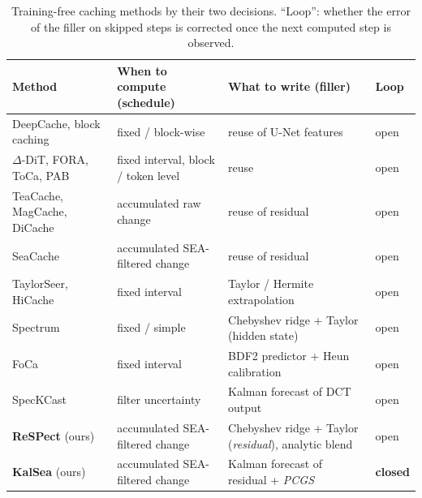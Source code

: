 \begin{table}[t]
  \centering
  \small
  \caption[Summary of training-free caching methods]{Training-free caching methods by their two decisions. ``Loop'': whether the error of the filler on skipped steps is corrected once the next computed step is observed.}
  \label{tab:lit-summary}
  \begin{tabularx}{\textwidth}{@{}l>{\raggedright\arraybackslash}X>{\raggedright\arraybackslash}Xl@{}}
    \toprule
    Method & When to compute (schedule) & What to write (filler) & Loop \\
    \midrule
    DeepCache, block caching & fixed / block-wise & reuse of U-Net features & open \\
    $\Delta$-DiT, FORA, ToCa, PAB & fixed interval, block / token level & reuse & open \\
    TeaCache, MagCache, DiCache & accumulated raw change & reuse of residual & open \\
    SeaCache & accumulated SEA-filtered change & reuse of residual & open \\
    TaylorSeer, HiCache & fixed interval & Taylor / Hermite extrapolation & open \\
    Spectrum & fixed / simple & Chebyshev ridge + Taylor (hidden state) & open \\
    FoCa & fixed interval & BDF2 predictor + Heun calibration & open \\
    SpecKCast & filter uncertainty & Kalman forecast of DCT output & open \\
    \midrule
    \textbf{ReSPect} (ours) & accumulated SEA-filtered change & Chebyshev ridge + Taylor (\emph{residual}), analytic blend & open \\
    \textbf{KalSea} (ours) & accumulated SEA-filtered change & Kalman forecast of residual + \emph{PCGS} & \textbf{closed} \\
    \bottomrule
  \end{tabularx}
\end{table}
